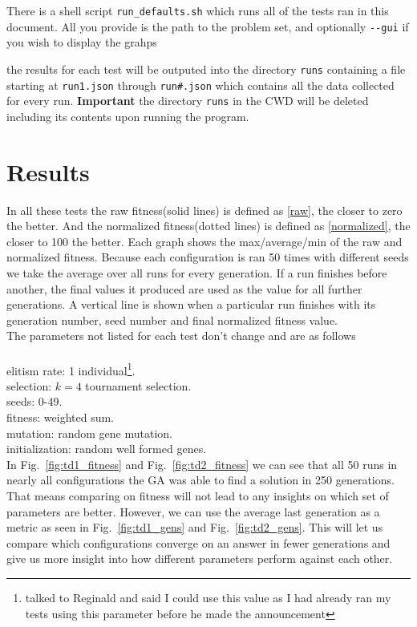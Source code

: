 \documentclass[conference]{IEEEtran}
\begin{document}
There is a shell script \texttt{run\_defaults.sh} which runs all of the tests ran in this document. All you provide is the path to the problem set, and optionally \texttt{-{}-gui} if you wish to display the grahps\vspace{8pt}

the results for each test will be outputed into the directory \texttt{runs} containing a file starting at \texttt{run1.json} through \texttt{run\#.json} which contains all the data collected for every run. \textbf{Important} the directory \texttt{runs} in the CWD will be deleted including its contents upon running the program.

\section{Results}

In all these tests the raw fitness(solid lines) is defined as \eqref{raw}, the closer to zero the better. And the normalized fitness(dotted lines) is defined as \eqref{normalized}, the closer to 100 the better. Each graph shows the max/average/min of the raw and normalized fitness. Because each configuration is ran 50 times with different seeds we take the average over all runs for every generation. If a run finishes before another, the final values it produced are used as the value for all further generations. A vertical line is shown when a particular run finishes with its generation number, seed number and final normalized fitness value.\\

The parameters not listed for each test don't change and are as follows\\\\
elitism rate: 1 individual\footnote{talked to Reginald and said I could use this value as I had already ran my tests using this parameter before he made the announcement}.\\
selection: $k=4$ tournament selection.\\
seeds: 0-49.\\
fitness: weighted sum.\\
mutation: random gene mutation.\\
initialization: random well formed genes.\\

In Fig.~\ref{fig:td1_fitness} and Fig.~\ref{fig:td2_fitness} we can see that all 50 runs in nearly all configurations the GA was able to find a solution in 250 generations. That means comparing on fitness will not lead to any insights on which set of parameters are better. However, we can use the average last generation as a metric as seen in Fig.~\ref{fig:td1_gens} and Fig.~\ref{fig:td2_gens}. This will let us compare which configurations converge on an answer in fewer generations and give us more insight into how different parameters perform against each other.\\
\end{document}
